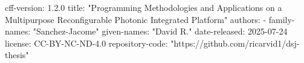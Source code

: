 cff-version: 1.2.0
title: "Programming Methodologies and Applications on a Multipurpose Reconfigurable Photonic Integrated Platform"
authors:
- family-names: "Sanchez-Jacome"
given-names: "David R."
date-released: 2025-07-24
license: CC-BY-NC-ND-4.0
repository-code: "https://github.com/ricarvid1/dsj-thesis"
